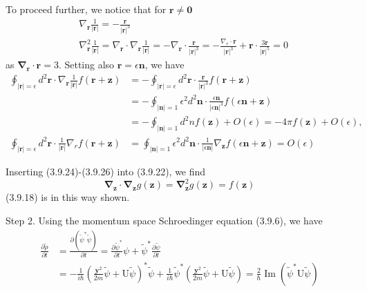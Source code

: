 \documentclass{article}
\begin{document}
To proceed further, we notice that for $\boldsymbol{r} \neq \mathbf{0}$
$$
\begin{align*}
& \nabla_{\boldsymbol{r}} \frac{1}{|\boldsymbol{r}|}=-\frac{\boldsymbol{r}}{|\boldsymbol{r}|^{3}}  \tag{3.9.23}\\
& \nabla_{\boldsymbol{r}}^{2} \frac{1}{|\boldsymbol{r}|}=\nabla_{\boldsymbol{r}} \cdot \nabla_{\boldsymbol{r}} \frac{1}{|\boldsymbol{r}|}=-\nabla_{\boldsymbol{r}} \cdot \frac{\boldsymbol{r}}{|\boldsymbol{r}|^{3}}=-\frac{\nabla_{r} \cdot \boldsymbol{r}}{|\boldsymbol{r}|^{3}}+\boldsymbol{r} \cdot \frac{3 \boldsymbol{r}}{|\boldsymbol{r}|^{5}}=0 \tag{3.9.24}
\end{align*}
$$
as $\boldsymbol{\nabla}_{\boldsymbol{r}} \cdot \boldsymbol{r}=3$. Setting also $\boldsymbol{r}=\epsilon \boldsymbol{n}$, we have
$$
\begin{align*}
\oint_{|\boldsymbol{r}|=\epsilon} d^{2} \boldsymbol{r} \cdot \nabla_{\boldsymbol{r}} \frac{1}{|\boldsymbol{r}|} f(\boldsymbol{r}+\boldsymbol{z}) & =-\oint_{|\boldsymbol{r}|=\epsilon} d^{2} \boldsymbol{r} \cdot \frac{\boldsymbol{r}}{|\boldsymbol{r}|^{3}} f(\boldsymbol{r}+\boldsymbol{z})  \tag{3.9.25}\\
& =-\oint_{|\boldsymbol{n}|=1} \epsilon^{2} d^{2} \boldsymbol{n} \cdot \frac{\epsilon \boldsymbol{n}}{|\epsilon \boldsymbol{n}|^{3}} f(\epsilon \boldsymbol{n}+\boldsymbol{z}) \\
& =-\oint_{|\boldsymbol{n}|=1} d^{2} n f(\boldsymbol{z})+O(\epsilon)=-4 \pi f(\boldsymbol{z})+O(\epsilon), \\
\oint_{|\boldsymbol{r}|=\epsilon} d^{2} \boldsymbol{r} \cdot \frac{1}{|\boldsymbol{r}|} \nabla_{r} f(\boldsymbol{r}+\boldsymbol{z}) & =\oint_{|\boldsymbol{n}|=1} \epsilon^{2} d^{2} \boldsymbol{n} \cdot \frac{1}{|\epsilon \boldsymbol{n}|} \nabla_{\boldsymbol{z}} f(\epsilon \boldsymbol{n}+\boldsymbol{z})=O(\epsilon) \tag{3.9.26}
\end{align*}
$$

Inserting (3.9.24)-(3.9.26) into (3.9.22), we find
$$
\begin{equation*}
\boldsymbol{\nabla}_{\boldsymbol{z}} \cdot \boldsymbol{\nabla}_{\boldsymbol{z}} g(\boldsymbol{z})=\boldsymbol{\nabla}_{\boldsymbol{z}}^{2} g(\boldsymbol{z})=f(\boldsymbol{z}) \tag{3.9.27}
\end{equation*}
$$
(3.9.18) is in this way shown.

Step 2. Using the momentum space Schroedinger equation (3.9.6), we have
$$
\begin{align*}
\frac{\partial \tilde{\rho}}{\partial t} & =\frac{\partial\left(\tilde{\psi}^{*} \tilde{\psi}\right)}{\partial t}=\frac{\partial \tilde{\psi}^{*}}{\partial t} \psi+\tilde{\psi}^{*} \frac{\partial \tilde{\psi}}{\partial t}  \tag{3.9.28}\\
& =-\frac{1}{i \hbar}\left(\frac{\boldsymbol{y}^{2}}{2 m} \tilde{\psi}+\mathrm{U} \tilde{\psi}\right)^{*} \tilde{\psi}+\frac{1}{i \hbar} \tilde{\psi}^{*}\left(\frac{\boldsymbol{y}^{2}}{2 m} \tilde{\psi}+\mathrm{U} \tilde{\psi}\right)=\frac{2}{\hbar} \operatorname{Im}\left(\tilde{\psi}^{*} \mathrm{U} \tilde{\psi}\right)
\end{align*}
$$
\end{document}
